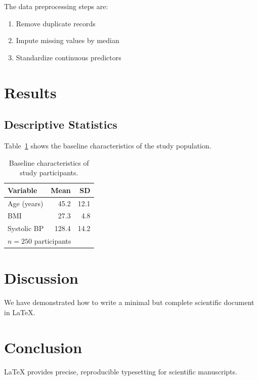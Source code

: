 \documentclass[12pt, a4paper]{article}
\begin{document}
The data preprocessing steps are:

\begin{enumerate}
  \item Remove duplicate records
  \item Impute missing values by median
  \item Standardize continuous predictors
\end{enumerate}

\section{Results}

\subsection{Descriptive Statistics}

Table~\ref{tab:desc} shows the baseline characteristics
of the study population.

\begin{table}[htbp]
  \centering
  \caption{Baseline characteristics of study participants.}
  \label{tab:desc}
  \begin{tabular}{lrr}
    \toprule
    Variable      & Mean  & SD    \\
    \midrule
    Age (years)   & 45.2  & 12.1  \\
    BMI           & 27.3  &  4.8  \\
    Systolic BP   & 128.4 & 14.2  \\
    \midrule
    \multicolumn{3}{l}{\small $n = 250$ participants} \\
    \bottomrule
  \end{tabular}
\end{table}

\section{Discussion}

We have demonstrated how to write a minimal but complete
scientific document in \LaTeX.

\section{Conclusion}

\LaTeX{} provides precise, reproducible typesetting
for scientific manuscripts.
\end{document}
